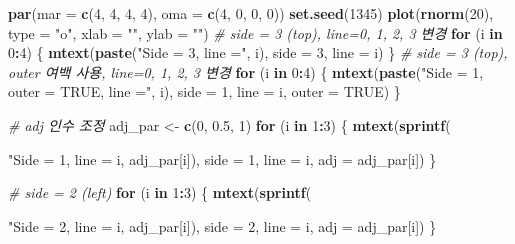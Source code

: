 \documentclass[
  11pt,
]{krantz}
\newenvironment{Shaded}{\begin{snugshade}}{\end{snugshade}}
\newcommand{\CommentTok}[1]{\textcolor[rgb]{0.37,0.37,0.37}{\textit{#1}}}
\newcommand{\ControlFlowTok}[1]{\textcolor[rgb]{0.27,0.27,0.27}{\textbf{#1}}}
\newcommand{\DataTypeTok}[1]{\textcolor[rgb]{0.27,0.27,0.27}{#1}}
\newcommand{\DecValTok}[1]{\textcolor[rgb]{0.06,0.06,0.06}{#1}}
\newcommand{\FloatTok}[1]{\textcolor[rgb]{0.06,0.06,0.06}{#1}}
\newcommand{\KeywordTok}[1]{\textcolor[rgb]{0.27,0.27,0.27}{\textbf{#1}}}
\newcommand{\NormalTok}[1]{#1}
\newcommand{\OperatorTok}[1]{\textcolor[rgb]{0.43,0.43,0.43}{\textbf{#1}}}
\newcommand{\OtherTok}[1]{\textcolor[rgb]{0.37,0.37,0.37}{#1}}
\newcommand{\StringTok}[1]{\textcolor[rgb]{0.5,0.5,0.5}{#1}}
\begin{document}
\normalsize

\footnotesize

\begin{Shaded}
\begin{Highlighting}[]
\KeywordTok{par}\NormalTok{(}\DataTypeTok{mar =} \KeywordTok{c}\NormalTok{(}\DecValTok{4}\NormalTok{, }\DecValTok{4}\NormalTok{, }\DecValTok{4}\NormalTok{, }\DecValTok{4}\NormalTok{),}
    \DataTypeTok{oma =} \KeywordTok{c}\NormalTok{(}\DecValTok{4}\NormalTok{, }\DecValTok{0}\NormalTok{, }\DecValTok{0}\NormalTok{, }\DecValTok{0}\NormalTok{))}
\KeywordTok{set.seed}\NormalTok{(}\DecValTok{1345}\NormalTok{)}
\KeywordTok{plot}\NormalTok{(}\KeywordTok{rnorm}\NormalTok{(}\DecValTok{20}\NormalTok{),}
     \DataTypeTok{type =} \StringTok{"o"}\NormalTok{,}
     \DataTypeTok{xlab =} \StringTok{""}\NormalTok{, }\DataTypeTok{ylab =} \StringTok{""}\NormalTok{)}
\CommentTok{# side = 3 (top), line=0, 1, 2, 3 변경}
\ControlFlowTok{for}\NormalTok{ (i }\ControlFlowTok{in} \DecValTok{0}\OperatorTok{:}\DecValTok{4}\NormalTok{) \{}
  \KeywordTok{mtext}\NormalTok{(}\KeywordTok{paste}\NormalTok{(}\StringTok{"Side = 3, line ="}\NormalTok{, i),}
        \DataTypeTok{side =} \DecValTok{3}\NormalTok{,}
        \DataTypeTok{line =}\NormalTok{ i)}
\NormalTok{\}}
\CommentTok{# side = 3 (top), outer 여백 사용, line=0, 1, 2, 3 변경}
\ControlFlowTok{for}\NormalTok{ (i }\ControlFlowTok{in} \DecValTok{0}\OperatorTok{:}\DecValTok{4}\NormalTok{) \{}
  \KeywordTok{mtext}\NormalTok{(}\KeywordTok{paste}\NormalTok{(}\StringTok{"Side = 1, outer = TRUE, line ="}\NormalTok{, i),}
        \DataTypeTok{side =} \DecValTok{1}\NormalTok{,}
        \DataTypeTok{line =}\NormalTok{ i,}
        \DataTypeTok{outer =} \OtherTok{TRUE}\NormalTok{)}
\NormalTok{\}}

\CommentTok{# adj 인수 조정}
\NormalTok{adj_par <-}\StringTok{ }\KeywordTok{c}\NormalTok{(}\DecValTok{0}\NormalTok{, }\FloatTok{0.5}\NormalTok{, }\DecValTok{1}\NormalTok{)}
\ControlFlowTok{for}\NormalTok{ (i }\ControlFlowTok{in} \DecValTok{1}\OperatorTok{:}\DecValTok{3}\NormalTok{) \{}
  \KeywordTok{mtext}\NormalTok{(}\KeywordTok{sprintf}\NormalTok{(}\StringTok{"Side = 1, line = %
\NormalTok{                i, adj_par[i]),}
  \DataTypeTok{side =} \DecValTok{1}\NormalTok{, }\DataTypeTok{line =}\NormalTok{ i, }\DataTypeTok{adj =}\NormalTok{ adj_par[i])}
\NormalTok{\}}

\CommentTok{# side = 2 (left)}
\ControlFlowTok{for}\NormalTok{ (i }\ControlFlowTok{in} \DecValTok{1}\OperatorTok{:}\DecValTok{3}\NormalTok{) \{}
  \KeywordTok{mtext}\NormalTok{(}\KeywordTok{sprintf}\NormalTok{(}\StringTok{"Side = 2, line = %
\NormalTok{                i, adj_par[i]),}
  \DataTypeTok{side =} \DecValTok{2}\NormalTok{, }\DataTypeTok{line =}\NormalTok{ i, }\DataTypeTok{adj =}\NormalTok{ adj_par[i])}
\NormalTok{\}}

}}
\end{Highlighting}
\end{Shaded}
\end{document}
